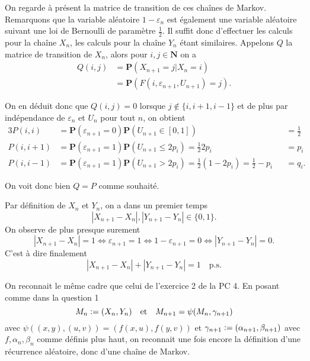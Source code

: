 \documentclass[12pt]{article}
\newcommand{\defeq}{\vcentcolon=}
\newcommand{\N}{\mathbf{N}}
\begin{document}
\medskip

On regarde à présent la matrice de transition de ces chaînes de Markov.
Remarquons que la variable aléatoire $1-\varepsilon_{n}$ est également une variable aléatoire suivant une loi de Bernoulli de paramètre $\frac{1}{2}$. Il suffit donc d'effectuer les calculs pour la chaîne $X_{n}$, les calculs pour la chaîne $Y_{n}$ étant similaires.
Appelons $Q$ la matrice de transition de $X_{n}$, alors pour $i, j \in \N$ on a 
\begin{align*}
        Q(i, j) &= \mathbf{P}(X_{n+1} = j | X_{n} = i) \\
                &= \mathbf{P}(F(i, \varepsilon_{n+1}, U_{n+1}) = j)
.\end{align*}

On en déduit donc que $Q(i,j) = 0$ lorsque $j \not\in \{i, i+1, i-1\}$ et de plus par indépendance de $\varepsilon_{n}$ et $U_{n}$ pour tout $n$, on obtient
\begin{alignat*}{3}
        P(i,i) &= \mathbf{P}(\varepsilon_{n+1} = 0)\mathbf{P}(U_{n+1} \in [0,1]) &&= \frac{1}{2} \\
        P(i,i+1) &= \mathbf{P}(\varepsilon_{n+1} = 1)\mathbf{P}(U_{n+1} \le 2p_{i}) = \frac{1}{2}2p_{i} &&= p_{i} \\
        P(i,i-1) &= \mathbf{P}(\varepsilon_{n+1} = 1)\mathbf{P}(U_{n+1} > 2p_{i}) = \frac{1}{2}(1-2p_{i}) = \frac{1}{2} - p_{i} &&= q_{i} 
.\end{alignat*}

On voit donc bien $Q = P$ comme souhaité.

\medskip

Par définition de $X_{n}$ et $Y_{n}$, on a dans un premier temps \[
        |X_{n+1} - X_{n} |, |Y_{n+1}-Y_{n}| \in \{0,1\} 
.\] On observe de plus presque surement \[
|X_{n+1}-X_{n}| = 1 \iff \varepsilon_{n+1} = 1 \iff 1 - \varepsilon_{n+1} = 0 \iff |Y_{n+1}- Y_{n}| = 0
.\] 
C'est à dire finalement
\[
|X_{n+1}-X_{n}|+|Y_{n+1}-Y_{n}| = 1 \quad \text{p.s.}
\] 

\medskip

On reconnait le même cadre que celui de l'exercice 2 de la PC 4. En posant comme dans la question 1 \[
        M_{n} \defeq (X_{n}, Y_{n}) \quad \text{et} \quad M_{n+1} = \psi(M_{n}, \gamma_{n+1})
\] avec $\psi((x,y), (u,v)) = (f(x,u), f(y, v))$ et $\gamma_{n+1} \defeq (\alpha_{n+1}, \beta_{n+1})$ avec $f, \alpha_{n}, \beta_{n}$ comme définis plus haut, on reconnait une fois encore la définition d'une récurrence aléatoire, donc d'une chaîne de Markov. 
\end{document}
